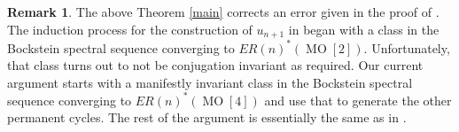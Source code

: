 \documentclass[12pt]{amsart}
\numberwithin{equation}{section}
\theoremstyle{plain}  %
\theoremstyle{definition}  %
\newtheorem{remark}[equation]{Remark}
\DeclareMathOperator{\MO}{MO}
\begin{document}
\medskip
\begin{remark} \label{error}
The above Theorem \ref{main} corrects an error given in the proof of \cite[Theorem 1.4]{KW14}.  The induction process for the construction of $u_{n+1}$ in \cite{KW14} began with a class in the Bockstein spectral sequence converging to $ER(n)^\ast(\MO[2])$. Unfortunately, that class turns out to not be conjugation invariant as required. Our current argument starts with a manifestly invariant class in the Bockstein spectral sequence converging to $ER(n)^*(\MO[4])$ and use that to generate the other permanent cycles. The rest of the argument is essentially the same as in \cite{KW14}. 
\end{remark}








{}

\end{document}
